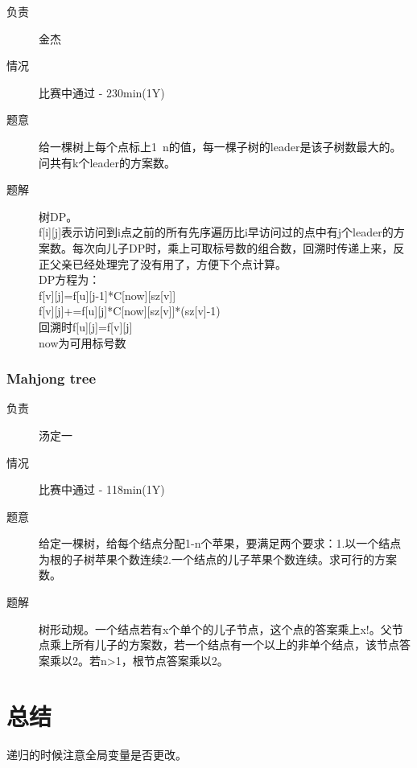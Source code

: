 \documentclass[a4paper, 11pt, nofonts, nocap, fancyhdr]{ctexart}
\newcommand{\problem}[1]{\subsubsection{#1}}
\begin{document}
\begin{description}
\item[负责] 金杰
\item[情况] 比赛中通过 - 230min(1Y)
\item[题意]
给一棵树上每个点标上1~n的值，每一棵子树的leader是该子树数最大的。问共有k个leader的方案数。
\item[题解]
树DP。\\
f[i][j]表示访问到i点之前的所有先序遍历比i早访问过的点中有j个leader的方案数。每次向儿子DP时，乘上可取标号数的组合数，回溯时传递上来，反正父亲已经处理完了没有用了，方便下个点计算。\\
DP方程为：\\
f[v][j]=f[u][j-1]*C[now][sz[v]]\\
f[v][j]+=f[u][j]*C[now][sz[v]]*(sz[v]-1)\\
回溯时f[u][j]=f[v][j]\\
now为可用标号数

\end{description}

\problem{Mahjong tree}

\begin{description}
\item[负责] 汤定一
\item[情况] 比赛中通过 - 118min(1Y)
\item[题意]
给定一棵树，给每个结点分配1-n个苹果，要满足两个要求：1.以一个结点为根的子树苹果个数连续2.一个结点的儿子苹果个数连续。求可行的方案数。
\item[题解]
树形动规。一个结点若有x个单个的儿子节点，这个点的答案乘上x!。父节点乘上所有儿子的方案数，若一个结点有一个以上的非单个结点，该节点答案乘以2。若n>1，根节点答案乘以2。
\end{description}


\section{总结}

递归的时候注意全局变量是否更改。
\end{document}
